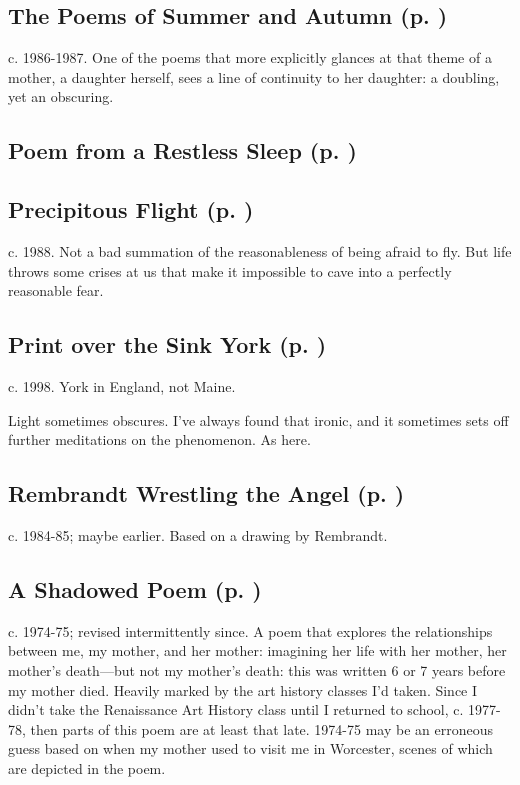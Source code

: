 \subsection*{The Poems of Summer and Autumn (p. \pageref{ch:the_poems_of_summer})}
c. 1986-1987. One of the poems that more explicitly
glances at that theme of a mother, a daughter herself, sees a line of
continuity to her daughter: a doubling, yet an
obscuring.

\subsection*{Poem from a Restless Sleep (p. \pageref{ch:poem_from_a_restless_sleep})}

\subsection*{Precipitous Flight (p. \pageref{ch:precipitous_flight})}
c. 1988. Not a bad summation of the reasonableness of
being afraid to fly. But life throws some crises at us that make it
impossible to cave into a perfectly reasonable fear.

\subsection*{Print over the Sink York (p. \pageref{ch:print_over_the_sink_york})}
c. 1998. York in England, not Maine.

Light sometimes obscures. I've always found that ironic, and it
sometimes sets off further meditations on the phenomenon. As here.

\subsection*{Rembrandt Wrestling the Angel (p. \pageref{ch:rembrandt_wrestling})}
c. 1984-85; maybe earlier. Based on a drawing by
Rembrandt.

\subsection*{A Shadowed Poem (p. \pageref{ch:a_shadowed_poem})}
c. 1974-75; revised intermittently since. A poem that
explores the relationships between me, my mother, and her mother:
imagining her life with her mother, her mother's death---but not my
mother's death: this was written 6 or 7 years before my mother died.
Heavily marked by the art history classes I'd taken. Since I didn't take
the Renaissance Art History class until I returned to school, c.
1977-78, then parts of this poem are at least that late. 1974-75 may be
an erroneous guess based on when my mother used to visit me in
Worcester, scenes of which are depicted in the
poem.


